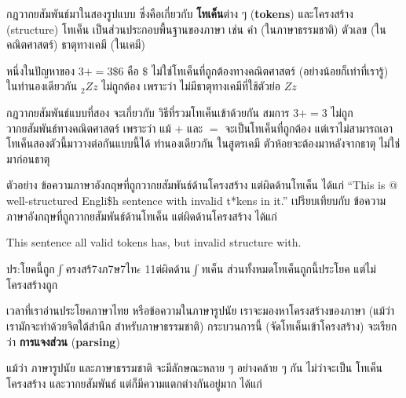 กฎวากยสัมพันธ์มาในสองรูปแบบ ซึ่งคือเกี่ยวกับ \textbf{โทเค็น}ต่าง ๆ (\textbf{tokens}) และโครงสร้าง (structure)
โทเค็น เป็นส่วนประกอบพื้นฐานของภาษา
เช่น คำ (ในภาษาธรรมชาติ) ตัวเลข (ในคณิตศาสตร์) ธาตุทางเคมี (ในเคมี)

หนึ่งในปัญหาของ
{\scriptsize$3 += 3 \$ 6$} คือ
{\scriptsize\( \$ \)} ไม่ใช่โทเค็นที่ถูกต้องทางคณิตศาสตร์ (อย่างน้อยก็เท่าที่เรารู้)
ในทำนองเดียวกัน {\scriptsize$_2Zz$} ไม่ถูกต้อง 
เพราะว่า
ไม่มีธาตุทางเคมีที่ใช้ตัวย่อ {\scriptsize$Zz$}

กฎวากยสัมพันธ์แบบที่สอง จะเกี่ยวกับ วิธีที่รวมโทเค็นเข้าด้วยกัน
สมการ {\scriptsize$3 += 3$} ไม่ถูกวากยสัมพันธ์ทางคณิตศาสตร์
เพราะว่า แม้ {\scriptsize$+$} และ {\scriptsize$=$} จะเป็นโทเค็นที่ถูกต้อง
แต่เราไม่สามารถเอาโทเค็นสองตัวนี้มาวางต่อกันแบบนี้ได้
ทำนองเดียวกัน ในสูตรเคมี ตัวห้อยจะต้องมาหลังจากธาตุ ไม่ใช่มาก่อนธาตุ

ตัวอย่าง ข้อความภาษาอังกฤษที่ถูกวากยสัมพันธ์ด้านโครงสร้าง 
แต่ผิดด้านโทเค็น ได้แก่
``This is @ well-structured Engli\$h
sentence with invalid t*kens in it.'' \;  
เปรียบเทียบกับ ข้อความภาษาอังกฤษที่ถูกวากยสัมพันธ์ด้านโทเค็น
แต่ผิดด้านโครงสร้าง ได้แก่

This sentence all valid tokens
has, but invalid structure with.

ปร:โยคนี้ถูก{\scriptsize$\int$}ครงสร้7งภ7ษ7ไท{\scriptsize$\epsilon$} 11ต่ผิดด้าน{\scriptsize$\int$}ทเค็น
ส่วนทั้งหมดโทเค็นถูกนี้ประโยค แต่ไม่โครงสร้างถูก

เวลาที่เราอ่านประโยคภาษาไทย 
หรือข้อความในภาษารูปนัย
เราจะมองหาโครงสร้างของภาษา (แม้ว่า เรามักจะทำด้วยจิตใต้สำนึก สำหรับภาษาธรรมชาติ)
กระบวนการนี้ (จัดโทเค็นเข้าโครงสร้าง) จะเรียกว่า \textbf{การแจงส่วน} (\textbf{parsing})

แม้ว่า ภาษารูปนัย และภาษาธรรมชาติ จะมีลักษณะหลาย ๆ อย่างคล้าย ๆ กัน ไม่ว่าจะเป็น โทเค็น โครงสร้าง และวากยสัมพันธ์
แต่ก็มีความแตกต่างกันอยู่มาก ได้แก่

